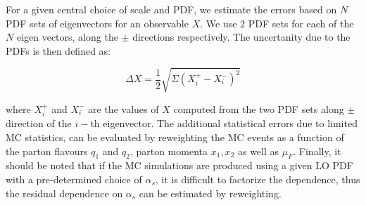 For a given central choice of scale and PDF, we estimate the errors based on $N$ PDF sets of 
eigenvectors for an observable $X$. We use $2$ PDF sets for each of the $N$ eigen vectors, 
along the $\pm$ directions respectively. The uncertanity due to the PDFs is then defined as:

\begin{equation}
	\Delta X = \frac{1}{2} \sqrt{\Sigma (X_i^+ - X_i^-)^2 }
\end{equation}

where $X_i^+$ and $X_i^-$ are the values of $X$ computed from the two PDF sets along $\pm$ direction of the 
$i-$th eigenvector. The additional statistical errors due to limited MC statistics, can be evaluated by reweighting
the MC events as a function of the parton flavours $q_1$ and $q_2$, parton momenta $x_1, x_2$ as well as $\mu_F$.
Finally, it should be noted that if the MC simulations are produced using a given LO PDF with a pre-determined 
choice of $\alpha_s$, it is difficult to factorize the dependence, thus the residual dependence on $\alpha_s$ 
can be estimated by reweighting.
